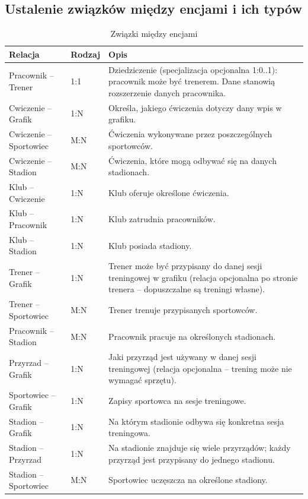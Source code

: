 \documentclass[11pt,a4paper]{article}
\begin{document}
\subsection{Ustalenie związków między encjami i ich typów}
\begin{table}[H]
\centering
\small
\begin{tabularx}{\textwidth}{|L{3.5cm}|C{1.6cm}|X|}
\hline
\textbf{Relacja} & \textbf{Rodzaj} & \textbf{Opis} \\
\hline
Pracownik -- Trener & 1:1 & Dziedziczenie (specjalizacja opcjonalna 1:0..1): pracownik może być trenerem. Dane stanowią rozszerzenie danych pracownika. \\
\hline
Cwiczenie -- Grafik & 1:N & Określa, jakiego ćwiczenia dotyczy dany wpis w grafiku. \\
\hline
Cwiczenie -- Sportowiec & M:N & Ćwiczenia wykonywane przez poszczególnych sportowców. \\
\hline
Cwiczenie -- Stadion & M:N & Ćwiczenia, które mogą odbywać się na danych stadionach. \\
\hline
Klub -- Cwiczenie & 1:N & Klub oferuje określone ćwiczenia. \\
\hline
Klub -- Pracownik & 1:N & Klub zatrudnia pracowników. \\
\hline
Klub -- Stadion & 1:N & Klub posiada stadiony. \\
\hline
Trener -- Grafik & 1:N & Trener może być przypisany do danej sesji treningowej w grafiku (relacja opcjonalna po stronie trenera -- dopuszczalne są treningi własne). \\
\hline
Trener -- Sportowiec & M:N & Trener trenuje przypisanych sportowców. \\
\hline
Pracownik -- Stadion & M:N & Pracownik pracuje na określonych stadionach. \\
\hline
Przyrzad -- Grafik & 1:N & Jaki przyrząd jest używany w danej sesji treningowej (relacja opcjonalna -- trening może nie wymagać sprzętu). \\
\hline
Sportowiec -- Grafik & 1:N & Zapisy sportowca na sesje treningowe. \\
\hline
Stadion -- Grafik & 1:N & Na którym stadionie odbywa się konkretna sesja treningowa. \\
\hline
Stadion -- Przyrzad & 1:N & Na stadionie znajduje się wiele przyrządów; każdy przyrząd jest przypisany do jednego stadionu. \\
\hline
Stadion -- Sportowiec & M:N & Sportowiec uczęszcza na określone stadiony. \\
\hline
\end{tabularx}
\caption{Związki między encjami}
\label{tab:zwiazki}
\end{table}
\end{document}

